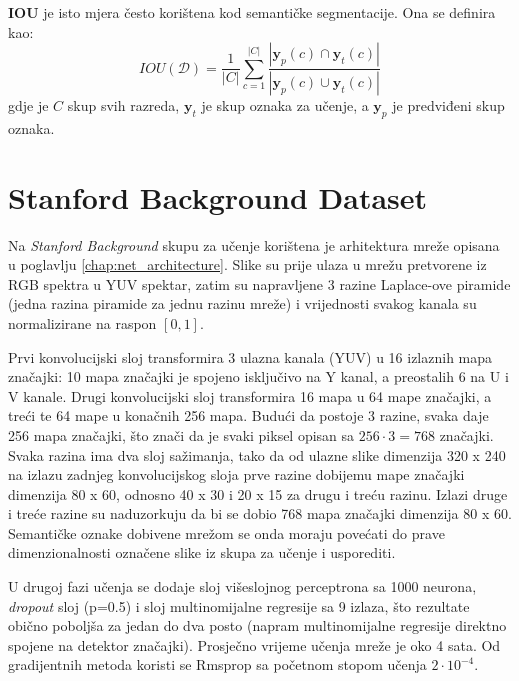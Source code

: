 \documentclass[times, utf8, diplomski, numeric]{fer}
\newcommand{\abs}[1]{\left\lvert#1\right\rvert}
\begin{document}
\textbf{IOU} je isto mjera često korištena kod semantičke segmentacije. Ona se definira kao:
\begin{equation}
  IOU \left( \mathcal{D} \right) = \frac{1}{\abs{C}} \sum_{c=1}^{\abs{C}} \frac{\abs{\boldsymbol{y}_p(c) \cap \boldsymbol{y}_t(c)}}{\abs{\boldsymbol{y}_p(c) \cup \boldsymbol{y}_t(c)}}
\end{equation}
gdje je $C$ skup svih razreda, $\boldsymbol{y}_t$ je skup oznaka za učenje, a $\boldsymbol{y}_p$ je predviđeni skup oznaka.

\section{Stanford Background Dataset}

Na \textit{Stanford Background} skupu za učenje korištena je arhitektura mreže opisana u poglavlju \ref{chap:net_architecture}. Slike su prije ulaza u mrežu pretvorene iz RGB spektra u YUV spektar, zatim su napravljene 3 razine Laplace-ove piramide (jedna razina piramide za jednu razinu mreže) i vrijednosti svakog kanala su normalizirane na raspon $\left[ 0, 1 \right]$.

Prvi konvolucijski sloj transformira 3 ulazna kanala (YUV) u 16 izlaznih mapa značajki: 10 mapa značajki je spojeno isključivo na Y kanal, a preostalih 6 na U i V kanale. Drugi konvolucijski sloj transformira 16 mapa u 64 mape značajki, a treći te 64 mape u konačnih 256 mapa. Budući da postoje 3 razine, svaka daje 256 mapa značajki, što znači da je svaki piksel opisan sa $256 \cdot 3 = 768$ značajki. Svaka razina ima dva sloj sažimanja, tako da od ulazne slike dimenzija 320 x 240 na izlazu zadnjeg konvolucijskog sloja prve razine dobijemu mape značajki dimenzija 80 x 60, odnosno 40 x 30 i 20 x 15 za drugu i treću razinu. Izlazi druge i treće razine su naduzorkuju da bi se dobio 768 mapa značajki dimenzija 80 x 60. Semantičke oznake dobivene mrežom se onda moraju povećati do prave dimenzionalnosti označene slike iz skupa za učenje i usporediti.

U drugoj fazi učenja se dodaje sloj višeslojnog perceptrona sa 1000 neurona, \textit{dropout} sloj (p=0.5) i sloj multinomijalne regresije sa 9 izlaza, što rezultate obično poboljša za jedan do dva posto (napram multinomijalne regresije direktno spojene na detektor značajki). Prosječno vrijeme učenja mreže je oko 4 sata. Od gradijentnih metoda koristi se Rmsprop sa početnom stopom učenja $2 \cdot 10^{-4}$.
\end{document}
